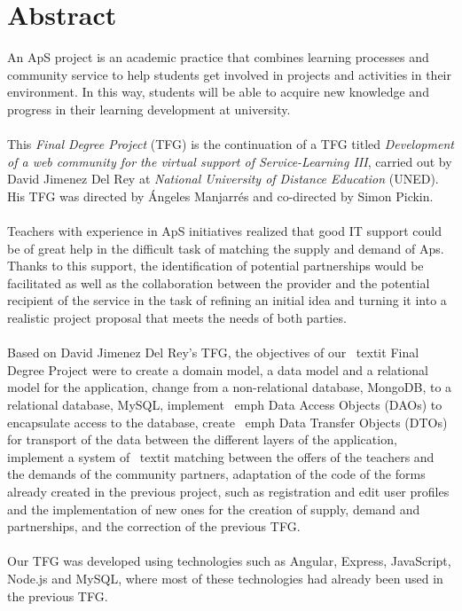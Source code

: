 \documentclass[11pt]{book}
\begin{document}
	\chapter*{Abstract} 
	An ApS project is an academic practice that combines learning processes and community service to help students get involved in projects and activities in their environment. In this way, students will be able to acquire new knowledge and progress in their learning development at university. \\\\
	This \textit{Final Degree Project} (TFG) is the continuation of a TFG titled \textit{Development of a web community for the virtual support of Service-Learning III}, carried out by David Jimenez Del Rey at \emph{National University of Distance Education} (UNED). His TFG was directed by Ángeles Manjarrés and co-directed by Simon Pickin. \\\\
	Teachers with experience in ApS initiatives realized that good IT support could be of great help in the difficult task of matching the supply and demand of Aps. Thanks to this support, the identification of potential partnerships would be facilitated as well as the collaboration between the provider and the potential recipient of the service in the task of refining an initial idea and turning it into a realistic project proposal that meets the needs of both parties. \\\\
	Based on David Jimenez Del Rey's TFG, the objectives of our \ textit {Final Degree Project} were to create a domain model, a data model and a relational model for the application, change from a non-relational database, MongoDB, to a relational database, MySQL, implement \ emph {Data Access Objects} (DAOs) to encapsulate access to the database, create \ emph {Data Transfer Objects} (DTOs) for transport of the data between the different layers of the application, implement a system of \ textit {matching} between the offers of the teachers and the demands of the community partners, adaptation of the code of the forms already created in the previous project, such as registration and edit user profiles and the implementation of new ones for the creation of supply, demand and partnerships, and the correction of the previous TFG. \\\\
	Our TFG was developed using technologies such as Angular, Express, JavaScript, Node.js and MySQL, where most of these technologies had already been used in the previous TFG.\\\\
	
\end{document}
